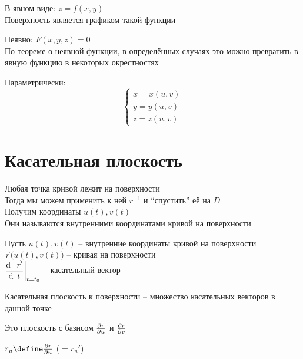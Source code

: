 \begin{exmpls}
	\item В явном виде: $ z = f(x, y) $ \\
	Поверхность является графиком такой функции
	\item Неявно: $ F(x, y, z) = 0 $ \\
	По теореме о неявной функции, в определённых случаях это можно превратить в явную функцию в некоторых окрестностях
	\item Параметрически:
	$$
	\begin{cases}
		x = x(u, v) \\
		y = y(u, v) \\
		z = z(u, v)
	\end{cases} $$
\end{exmpls}

\section{Касательная плоскость}

\begin{undefthm}
	Любая точка кривой лежит на поверхности \\
	Тогда мы можем применить к ней $ r^{-1} $ и ``спустить'' её на $ D $ \\
	Получим координаты $ u(t), v(t) $ \\
	Они называются внутренними координатами кривой на поверхности
\end{undefthm}

\begin{definition}
	Пусть $ u(t), v(t) $ -- внутренние координаты кривой на поверхности \\
	$ \vec{r} \bigg( u(t), v(t) \bigg) $ -- кривая на поверхности \\
	$ \dfrac{\di \vec{r}}{\di t}\clamp{t = t_0} $ -- касательный вектор
\end{definition}

\begin{definition}
	Касательная плоскость к поверхности -- множество касательных векторов в данной точке
\end{definition}

\begin{statement}
	Это плоскость с базисом $ \frac{\partial {r}}{\partial {u}} $ и $ \frac{\partial {r}}{\partial {v}} $
\end{statement}

\begin{notation}
	$ r_u \define \pder{r}u $ ($ = r_u' $)
\end{notation}

